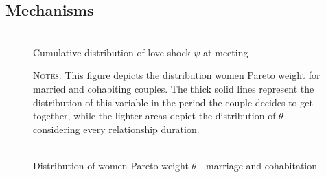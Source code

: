 \documentclass[12pt]{article}
\numberwithin{table}{section}
\begin{document}
\subsection{Mechanisms}
\begin{figure}[h!]
\centering
\caption{\\Cumulative distribution of love shock $\psi$ at meeting}
\hspace*{-1.3cm} 
\label{fig:psidist}
\resizebox{0.8\textwidth}{!}{}

\end{figure}

\begin{figure}[h!]
\centering
\caption{\\Distribution of women Pareto weight $\theta$---marriage and cohabitation}
\label{fig:thetadist}
\hspace*{-1.1cm} 
\resizebox{0.8\textwidth}{!}{}
\begin{minipage}{0.99\textwidth} %

\hspace{30em}

{\footnotesize \textsc{Notes.} This figure depicts the distribution women Pareto weight for married and cohabiting couples. The thick solid lines represent the distribution of this variable in the period the couple decides to get together, while the lighter areas depict the distribution of $\theta$ considering every relationship duration.\par}
\end{minipage}
\end{figure}
\FloatBarrier
\end{document}
